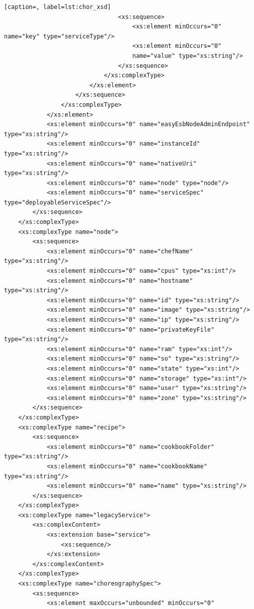 \documentclass[a4paper, 10pt]{article}
\begin{document}
{\begin{lstlisting}[caption=, label=lst:chor_xsd]
                                <xs:sequence>
                                    <xs:element minOccurs="0" name="key" type="serviceType"/>
                                    <xs:element minOccurs="0"
                                    name="value" type="xs:string"/>
                                </xs:sequence>
                            </xs:complexType>
                        </xs:element>
                    </xs:sequence>
                </xs:complexType>
            </xs:element>
            <xs:element minOccurs="0" name="easyEsbNodeAdminEndpoint" type="xs:string"/>
            <xs:element minOccurs="0" name="instanceId" type="xs:string"/>
            <xs:element minOccurs="0" name="nativeUri" type="xs:string"/>
            <xs:element minOccurs="0" name="node" type="node"/>
            <xs:element minOccurs="0" name="serviceSpec" type="deployableServiceSpec"/>
        </xs:sequence>
    </xs:complexType>
    <xs:complexType name="node">
        <xs:sequence>
            <xs:element minOccurs="0" name="chefName" type="xs:string"/>
            <xs:element minOccurs="0" name="cpus" type="xs:int"/>
            <xs:element minOccurs="0" name="hostname" type="xs:string"/>
            <xs:element minOccurs="0" name="id" type="xs:string"/>
            <xs:element minOccurs="0" name="image" type="xs:string"/>
            <xs:element minOccurs="0" name="ip" type="xs:string"/>
            <xs:element minOccurs="0" name="privateKeyFile" type="xs:string"/>
            <xs:element minOccurs="0" name="ram" type="xs:int"/>
            <xs:element minOccurs="0" name="so" type="xs:string"/>
            <xs:element minOccurs="0" name="state" type="xs:int"/>
            <xs:element minOccurs="0" name="storage" type="xs:int"/>
            <xs:element minOccurs="0" name="user" type="xs:string"/>
            <xs:element minOccurs="0" name="zone" type="xs:string"/>
        </xs:sequence>
    </xs:complexType>
    <xs:complexType name="recipe">
        <xs:sequence>
            <xs:element minOccurs="0" name="cookbookFolder" type="xs:string"/>
            <xs:element minOccurs="0" name="cookbookName" type="xs:string"/>
            <xs:element minOccurs="0" name="name" type="xs:string"/>
        </xs:sequence>
    </xs:complexType>
    <xs:complexType name="legacyService">
        <xs:complexContent>
            <xs:extension base="service">
                <xs:sequence/>
            </xs:extension>
        </xs:complexContent>
    </xs:complexType>
    <xs:complexType name="choreographySpec">
        <xs:sequence>
            <xs:element maxOccurs="unbounded" minOccurs="0"

\end{lstlisting}}
\end{document}
